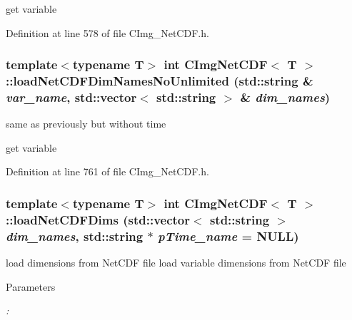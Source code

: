 \begin{DoxyCode}
\end{DoxyCode}
 

get variable 

Definition at line 578 of file CImg\_\-NetCDF.h.\hypertarget{classCImgNetCDF_afa914e4be782646fd737dd878a1806ca}{
\subsubsection[{loadNetCDFDimNamesNoUnlimited}]{\setlength{\rightskip}{0pt plus 5cm}template$<$typename T$>$ int {\bf CImgNetCDF}$<$ T $>$::loadNetCDFDimNamesNoUnlimited (std::string \& {\em var\_\-name}, \/  std::vector$<$ std::string $>$ \& {\em dim\_\-names})}}
\label{classCImgNetCDF_afa914e4be782646fd737dd878a1806ca}


same as previously but without time 

get variable 

Definition at line 761 of file CImg\_\-NetCDF.h.\hypertarget{classCImgNetCDF_a2cbfbccd1c9c37d7cbdafe9714c3cde8}{
\subsubsection[{loadNetCDFDims}]{\setlength{\rightskip}{0pt plus 5cm}template$<$typename T$>$ int {\bf CImgNetCDF}$<$ T $>$::loadNetCDFDims (std::vector$<$ std::string $>$ {\em dim\_\-names}, \/  std::string $\ast$ {\em pTime\_\-name} = {\ttfamily NULL})}}
\label{classCImgNetCDF_a2cbfbccd1c9c37d7cbdafe9714c3cde8}


load dimensions from NetCDF file load variable dimensions from NetCDF file


\begin{DoxyParams}{Parameters}
\item[{\em :}]\end{DoxyParams}

\begin{DoxyCode}
\end{DoxyCode}
 

